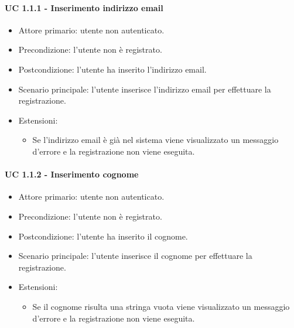         \paragraph{UC 1.1.1 - Inserimento indirizzo email}
            \begin{itemize}
                \item Attore primario: utente non autenticato.
                \item Precondizione: l'utente non è registrato.
                \item Postcondizione: l'utente ha inserito l'indirizzo email.
                \item Scenario principale: l'utente inserisce l'indirizzo email per effettuare la registrazione.
                \item Estensioni:
                    \begin{itemize}
                        \item Se l'indirizzo email è già nel sistema viene visualizzato un messaggio d'errore e la registrazione non viene eseguita.
                    \end{itemize}
            \end{itemize}
        \paragraph{UC 1.1.2 - Inserimento cognome}
            \begin{itemize}
                \item Attore primario: utente non autenticato.
                \item Precondizione: l'utente non è registrato.
                \item Postcondizione: l'utente ha inserito il cognome.
                \item Scenario principale: l'utente inserisce il cognome per effettuare la registrazione.
                \item Estensioni:
                    \begin{itemize}
                        \item Se il cognome risulta una stringa vuota viene visualizzato un messaggio d'errore e la registrazione non viene eseguita.
                    \end{itemize}
            \end{itemize}
